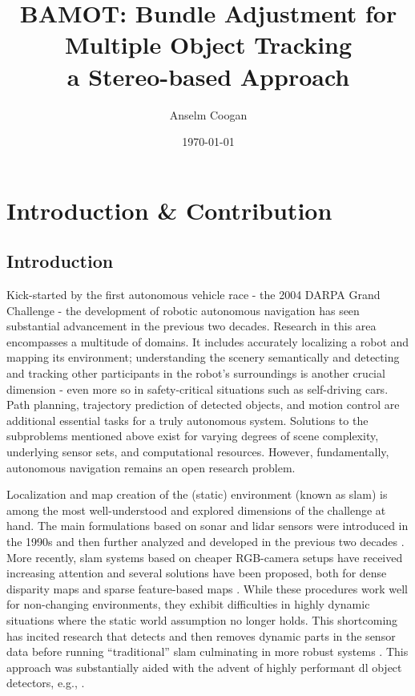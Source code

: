 \documentclass[headsepline, hidelinks, footsepline, footinclude=false, oneside, fontsize=11pt, paper=a4, listof=totoc, bibliography=totoc]{scrbook}
\author{Anselm Coogan}
\date{\today}
\title{BAMOT: Bundle Adjustment for Multiple Object Tracking\\\medskip
\large a Stereo-based Approach}
\begin{document}

\frontmatter{}





\newpage
{}
\tableofcontents
{}

\mainmatter{}

\chapter{Introduction \& Contribution}
\label{sec:org75ae8d0}
\section{Introduction}
\label{sec:org0ff1562}
 	Kick-started by the first autonomous vehicle race -  the 2004 DARPA Grand Challenge - the development of robotic autonomous navigation has seen substantial advancement in the previous two decades.
Research in this area encompasses a multitude of domains. 
It includes accurately localizing a robot and mapping its environment; understanding the scenery semantically and detecting and tracking other participants in the robot's surroundings is another crucial dimension - even more so in safety-critical situations such as self-driving cars. 
Path planning, trajectory prediction of detected objects, and motion control are additional essential tasks for a truly autonomous system. 
Solutions to the subproblems mentioned above exist for varying degrees of scene complexity, underlying sensor sets, and computational resources. 
However, fundamentally, autonomous navigation remains an open research problem.

Localization and map creation of the (static) environment (known as \gls{slam}) is among the most well-understood and explored dimensions of the challenge at hand. 
The main formulations based on \gls{sonar} and \gls{lidar} sensors were introduced in the 1990s and then further analyzed and developed in the previous two decades \cite{cadenaPresentFutureSimultaneous2016}.
More recently, \gls{slam} systems based on cheaper RGB-camera setups have received increasing attention and several solutions have been proposed, both for dense disparity maps \cite{engelLSDSLAMLargeScaleDirect2014} and sparse
feature-based maps \cite{engelDirectSparseOdometry2018,mur-artalORBSLAM2OpenSourceSLAM2017}. 
While these procedures work well for non-changing environments, they exhibit difficulties in highly dynamic situations where the static world assumption no longer holds.
This shortcoming has incited research that detects and then removes dynamic parts in the sensor data before running ``traditional'' \gls{slam} culminating in more robust systems \cite{yuDSSLAMSemanticVisual2018,bescosDynaSLAMTrackingMapping2018,salas-morenoSLAMSimultaneousLocalisation2013,liRGBDSLAMDynamic2017}.
This approach was substantially aided with the advent of highly performant \gls{dl} object detectors, e.g., \cite{redmonYouOnlyLook2016,heMaskRCNN2018,renFasterRCNNRealTime2017,xiangSubcategoryawareConvolutionalNeural2017}.
\end{document}
